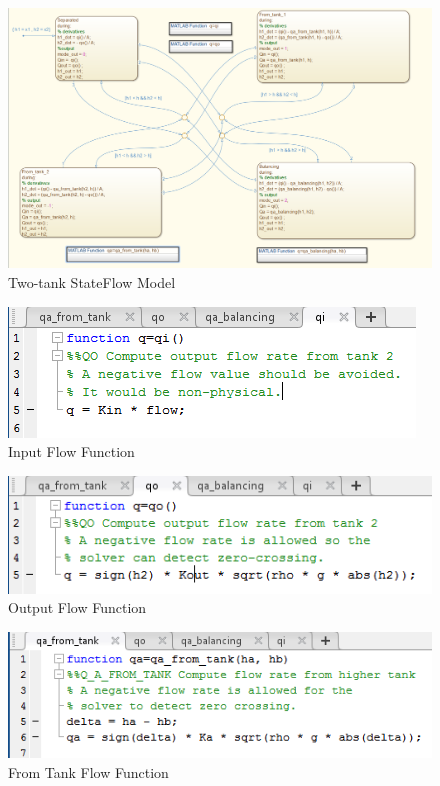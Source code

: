 \documentclass[letterpaper]{article}
\begin{document}
\begin{figure}[h!]
\centering
\includegraphics[scale=0.4]{hw8_two_tanks_Chart.png}
\caption{Two-tank StateFlow Model}
\label{fig:two-tank-stateflow}
\end{figure}

\begin{figure}[h!]
\centering
\includegraphics[scale=0.7]{hw8_qi_fn.png}
\caption{Input Flow Function}
\label{fig:q_in}
\end{figure}

\begin{figure}[h!]
\centering
\includegraphics[scale=0.7]{hw8_qo_fn.png}
\caption{Output Flow Function}
\label{fig:q_out}
\end{figure}

\begin{figure}[h!]
\centering
\includegraphics[scale=0.7]{hw8_qa_from_tank_fn.png}
\caption{From Tank Flow Function}
\label{fig:qa_from_tank}
\end{figure}
\end{document}
